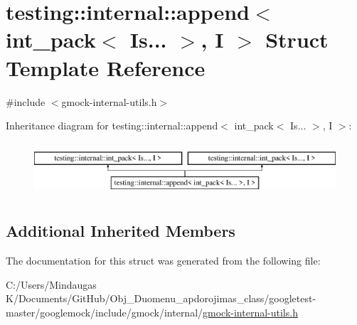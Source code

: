 \hypertarget{structtesting_1_1internal_1_1append_3_01int__pack_3_01_is_8_8_8_01_4_00_01_i_01_4}{}\section{testing\+::internal\+::append$<$ int\+\_\+pack$<$ Is... $>$, I $>$ Struct Template Reference}
\label{structtesting_1_1internal_1_1append_3_01int__pack_3_01_is_8_8_8_01_4_00_01_i_01_4}


{\ttfamily \#include $<$gmock-\/internal-\/utils.\+h$>$}

Inheritance diagram for testing\+::internal\+::append$<$ int\+\_\+pack$<$ Is... $>$, I $>$\+:\begin{figure}[H]
\begin{center}
\leavevmode
\includegraphics[height=2.000000cm]{d5/d77/structtesting_1_1internal_1_1append_3_01int__pack_3_01_is_8_8_8_01_4_00_01_i_01_4}
\end{center}
\end{figure}
\subsection*{Additional Inherited Members}


The documentation for this struct was generated from the following file\+:\begin{DoxyCompactItemize}
\item 
C\+:/\+Users/\+Mindaugas K/\+Documents/\+Git\+Hub/\+Obj\+\_\+\+Duomenu\+\_\+apdorojimas\+\_\+class/googletest-\/master/googlemock/include/gmock/internal/\mbox{\hyperlink{googletest-master_2googlemock_2include_2gmock_2internal_2gmock-internal-utils_8h}{gmock-\/internal-\/utils.\+h}}\end{DoxyCompactItemize}
